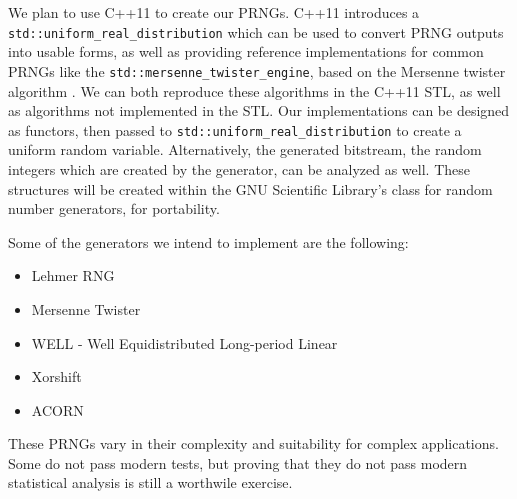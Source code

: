 We plan to use C++11 to create our PRNGs. C++11 introduces a \texttt{std::uniform\_real\_distribution} \cite{uniformrealdistribution} which can be used to convert PRNG outputs into usable forms, as well as providing reference implementations for common PRNGs like the \texttt{std::mersenne\_twister\_engine}, based on the Mersenne twister algorithm \cite{Matsumoto:1998:MTE:272991.272995}. We can both reproduce these algorithms in the C++11 STL, as well as algorithms not implemented in the STL. Our implementations can be designed as functors, then passed to \texttt{std::uniform\_real\_distribution} to create a uniform random variable. Alternatively, the generated bitstream, the random integers which are created by the generator, can be analyzed as well. These structures will be created within the GNU Scientific Library's class for random number generators, for portability.

Some of the generators we intend to implement are the following:
\begin{itemize}
    \item Lehmer RNG \cite{Payne:1969:CLP:362848.362860}
    \item Mersenne Twister \cite{Matsumoto:1998:MTE:272991.272995}
    \item WELL - Well Equidistributed Long-period Linear \cite{Panneton:2006:ILG:1132973.1132974}
    \item Xorshift \cite{Panneton:2005:XRN:1113316.1113319}
    \item ACORN \cite{Wikramaratna:2008:ACR:1363375.1363601}
\end{itemize}

These PRNGs vary in their complexity and suitability for complex applications. Some do not pass modern tests, but proving that they do not pass modern statistical analysis is still a worthwile exercise.
